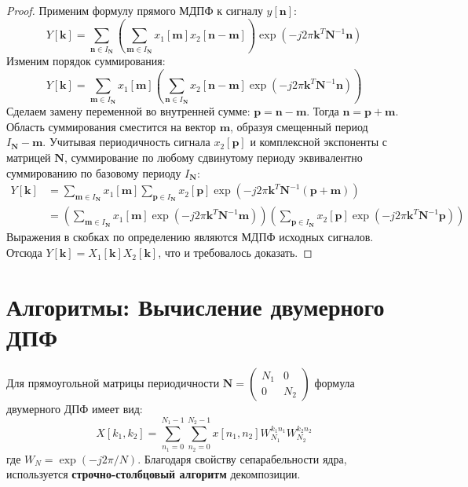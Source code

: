 \documentclass[12pt,a4paper]{article}
\begin{document}
\begin{proof}
Применим формулу прямого МДПФ к сигналу $y[\mathbf{n}]$:
\begin{equation}
    Y[\mathbf{k}] = \sum_{\mathbf{n} \in I_{\mathbf{N}}} \left( \sum_{\mathbf{m} \in I_{\mathbf{N}}} x_1[\mathbf{m}] x_2[\mathbf{n} - \mathbf{m}] \right) \exp\left(-j 2\pi \mathbf{k}^T \mathbf{N}^{-1} \mathbf{n}\right)
\end{equation}
Изменим порядок суммирования:
\begin{equation}
    Y[\mathbf{k}] = \sum_{\mathbf{m} \in I_{\mathbf{N}}} x_1[\mathbf{m}] \left( \sum_{\mathbf{n} \in I_{\mathbf{N}}} x_2[\mathbf{n} - \mathbf{m}] \exp\left(-j 2\pi \mathbf{k}^T \mathbf{N}^{-1} \mathbf{n}\right) \right)
\end{equation}
Сделаем замену переменной во внутренней сумме: $\mathbf{p} = \mathbf{n} - \mathbf{m}$. Тогда $\mathbf{n} = \mathbf{p} + \mathbf{m}$. Область суммирования сместится на вектор $\mathbf{m}$, образуя смещенный период $I_{\mathbf{N}} - \mathbf{m}$. Учитывая периодичность сигнала $x_2[\mathbf{p}]$ и комплексной экспоненты с матрицей $\mathbf{N}$, суммирование по любому сдвинутому периоду эквивалентно суммированию по базовому периоду $I_{\mathbf{N}}$:
\begin{align}
    Y[\mathbf{k}] &= \sum_{\mathbf{m} \in I_{\mathbf{N}}} x_1[\mathbf{m}] \sum_{\mathbf{p} \in I_{\mathbf{N}}} x_2[\mathbf{p}] \exp\left(-j 2\pi \mathbf{k}^T \mathbf{N}^{-1} (\mathbf{p} + \mathbf{m})\right) \\
    &= \left( \sum_{\mathbf{m} \in I_{\mathbf{N}}} x_1[\mathbf{m}] \exp\left(-j 2\pi \mathbf{k}^T \mathbf{N}^{-1} \mathbf{m}\right) \right) \left( \sum_{\mathbf{p} \in I_{\mathbf{N}}} x_2[\mathbf{p}] \exp\left(-j 2\pi \mathbf{k}^T \mathbf{N}^{-1} \mathbf{p}\right) \right)
\end{align}
Выражения в скобках по определению являются МДПФ исходных сигналов. Отсюда $Y[\mathbf{k}] = X_1[\mathbf{k}] X_2[\mathbf{k}]$, что и требовалось доказать.
\end{proof}

\section{Алгоритмы: Вычисление двумерного ДПФ}

Для прямоугольной матрицы периодичности $\mathbf{N} = \begin{pmatrix} N_1 & 0 \\ 0 & N_2 \end{pmatrix}$ формула двумерного ДПФ имеет вид:
\begin{equation}
    X[k_1, k_2] = \sum_{n_1=0}^{N_1-1} \sum_{n_2=0}^{N_2-1} x[n_1, n_2] W_{N_1}^{k_1 n_1} W_{N_2}^{k_2 n_2}
\end{equation}
где $W_{N} = \exp(-j 2\pi / N)$. Благодаря свойству сепарабельности ядра, используется \textbf{строчно-столбцовый алгоритм} декомпозиции.
\end{document}
